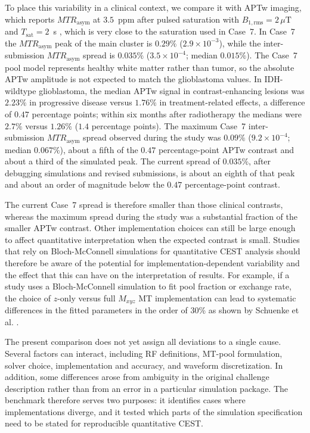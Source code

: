 \documentclass[11pt,a4paper]{article}
\begin{document}
To place this variability in a clinical context, we compare it with APTw imaging, which reports $MTR_{\mathrm{asym}}$ at $3.5$~ppm after pulsed saturation with $B_{1,\mathrm{rms}}=2\,\mu\mathrm{T}$ and $T_{\mathrm{sat}}=2$~s \cite{Zeyen2025}, which is very close to the saturation used in Case~7.
In Case~7 the $MTR_{\mathrm{asym}}$ peak of the main cluster is $0.29\%$ ($2.9\times10^{-3}$), while the inter-submission $MTR_{\mathrm{asym}}$ spread is $0.035\%$ ($3.5\times10^{-4}$; median $0.015\%$). The Case~7 pool model represents healthy white matter rather than tumor, so the absolute APTw amplitude is not expected to match the glioblastoma values.
In IDH-wildtype glioblastoma, the median APTw signal in contrast-enhancing lesions was $2.23\%$ in progressive disease versus $1.76\%$ in treatment-related effects, a difference of $0.47$ percentage points; within six months after radiotherapy the medians were $2.7\%$ versus $1.26\%$ ($1.4$ percentage points).
The maximum Case~7 inter-submission $MTR_{\mathrm{asym}}$ spread observed during the study was $0.09\%$ ($9.2\times10^{-4}$; median $0.067\%$), about a fifth of the $0.47$ percentage-point APTw contrast and about a third of the simulated peak. 
The current spread of $0.035\%$, after debugging simulations and revised submissions, is about an eighth of that peak and about an order of magnitude below the $0.47$ percentage-point contrast.

The current Case~7 spread is therefore smaller than those clinical contrasts, whereas the maximum spread during the study was a substantial fraction of the smaller APTw contrast. 
Other implementation choices can still be large enough to affect quantitative interpretation when the expected contrast is small.
Studies that rely on Bloch-McConnell simulations for quantitative CEST analysis should therefore be aware of the potential for implementation-dependent variability and the effect that this can have on the interpretation of results.
For example, if a study uses a Bloch-McConnell simulation to fit pool fraction or exchange rate, the choice of $z$-only versus full $M_{xyz}$ MT implementation can lead to systematic differences in the fitted parameters in the order of 30\% as shown by Schuenke et al. \cite{Schuenke2023}.


The present comparison does not yet assign all deviations to a single cause. Several factors can interact, including RF definitions, MT-pool formulation, solver choice, implementation and accuracy, and waveform discretization. In addition, some differences arose from ambiguity in the original challenge description rather than from an error in a particular simulation package. 
The benchmark therefore serves two purposes: it identifies cases where implementations diverge, and it tested which parts of the simulation specification need to be stated for reproducible quantitative CEST.
\end{document}
